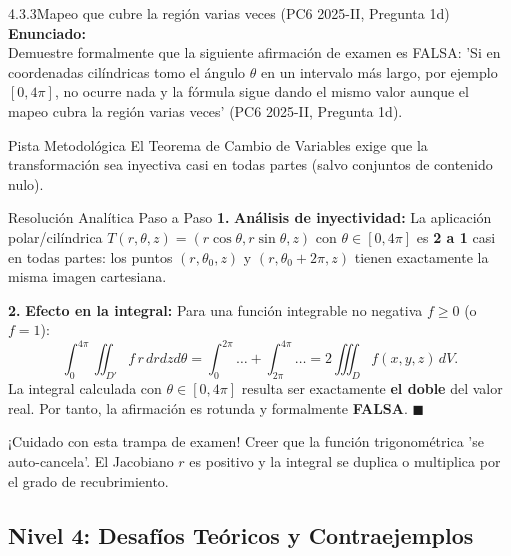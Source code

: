 \documentclass[11pt,a4paper]{article}
\begin{document}
\begin{nivelbox}{4.3.3}{Mapeo que cubre la región varias veces (PC6 2025-II, Pregunta 1d)}
\textbf{Enunciado:}\\
Demuestre formalmente que la siguiente afirmación de examen es FALSA: 'Si en coordenadas cilíndricas tomo el ángulo $\theta$ en un intervalo más largo, por ejemplo $[0, 4\pi]$, no ocurre nada y la fórmula sigue dando el mismo valor aunque el mapeo cubra la región varias veces' (PC6 2025-II, Pregunta 1d).

\begin{observacionbox}{Pista Metodológica}
El Teorema de Cambio de Variables exige que la transformación sea inyectiva casi en todas partes (salvo conjuntos de contenido nulo).
\end{observacionbox}

\begin{ejerciciobox}{Resolución Analítica Paso a Paso}
\smallskip\noindent\textbf{1.} \textbf{Análisis de inyectividad:}
La aplicación polar/cilíndrica $T(r, \theta, z) = (r\cos\theta, r\sin\theta, z)$ con $\theta \in [0, 4\pi]$ es \textbf{2 a 1} casi en todas partes: los puntos $(r, \theta_0, z)$ y $(r, \theta_0 + 2\pi, z)$ tienen exactamente la misma imagen cartesiana.

\smallskip\noindent\textbf{2.} \textbf{Efecto en la integral:}
Para una función integrable no negativa $f \ge 0$ (o $f = 1$):
\[\int_0^{4\pi} \iint_{D'} f \, r \, dr dz d\theta = \int_0^{2\pi} \dots + \int_{2\pi}^{4\pi} \dots = 2 \iiint_D f(x,y,z) \, dV.\]
La integral calculada con $\theta \in [0, 4\pi]$ resulta ser exactamente \textbf{el doble} del valor real.
Por tanto, la afirmación es rotunda y formalmente \textbf{FALSA}. $\blacksquare$
\end{ejerciciobox}

\begin{errorbox}{¡Cuidado con esta trampa de examen!}
Creer que la función trigonométrica 'se auto-cancela'. El Jacobiano $r$ es positivo y la integral se duplica o multiplica por el grado de recubrimiento.
\end{errorbox}
\end{nivelbox}
\bigskip

\subsection{Nivel 4: Desafíos Teóricos y Contraejemplos}
\end{document}
